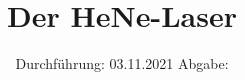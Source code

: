 

\subject{V61}
\title{Der HeNe-Laser}
\date{%
  Durchführung: 03.11.2021
  \hspace{3em}
  Abgabe: 
}



\maketitle
\thispagestyle{empty}
\tableofcontents
\newpage







\printbibliography{}


